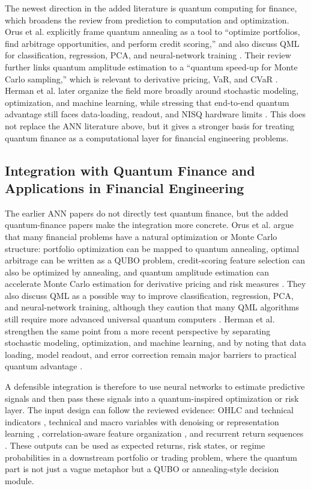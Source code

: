 \documentclass[conference]{IEEEtran}
\begin{document}
The newest direction in the added literature is quantum computing for finance, which broadens the review from prediction to computation and optimization. Orus et al. explicitly frame quantum annealing as a tool to ``optimize portfolios, find arbitrage opportunities, and perform credit scoring,'' and also discuss QML for classification, regression, PCA, and neural-network training \cite{orus2019quantum}. Their review further links quantum amplitude estimation to a ``quantum speed-up for Monte Carlo sampling,'' which is relevant to derivative pricing, VaR, and CVaR \cite{orus2019quantum}. Herman et al. later organize the field more broadly around stochastic modeling, optimization, and machine learning, while stressing that end-to-end quantum advantage still faces data-loading, readout, and NISQ hardware limits \cite{herman2023quantum}. This does not replace the ANN literature above, but it gives a stronger basis for treating quantum finance as a computational layer for financial engineering problems.

\subsection{Integration with Quantum Finance and Applications in Financial Engineering}
The earlier ANN papers do not directly test quantum finance, but the added quantum-finance papers make the integration more concrete. Orus et al. argue that many financial problems have a natural optimization or Monte Carlo structure: portfolio optimization can be mapped to quantum annealing, optimal arbitrage can be written as a QUBO problem, credit-scoring feature selection can also be optimized by annealing, and quantum amplitude estimation can accelerate Monte Carlo estimation for derivative pricing and risk measures \cite{orus2019quantum}. They also discuss QML as a possible way to improve classification, regression, PCA, and neural-network training, although they caution that many QML algorithms still require more advanced universal quantum computers \cite{orus2019quantum}. Herman et al. strengthen the same point from a more recent perspective by separating stochastic modeling, optimization, and machine learning, and by noting that data loading, model readout, and error correction remain major barriers to practical quantum advantage \cite{herman2023quantum}.

A defensible integration is therefore to use neural networks to estimate predictive signals and then pass these signals into a quantum-inspired optimization or risk layer. The input design can follow the reviewed evidence: OHLC and technical indicators \cite{singh2017stock,nakano2018bitcoin}, technical and macro variables with denoising or representation learning \cite{bao2017deep,chong2017deep}, correlation-aware feature organization \cite{gunduz2017intraday}, and recurrent return sequences \cite{fischer2018deep,shen2018gru}. These outputs can be used as expected returns, risk states, or regime probabilities in a downstream portfolio or trading problem, where the quantum part is not just a vague metaphor but a QUBO or annealing-style decision module.
\end{document}

